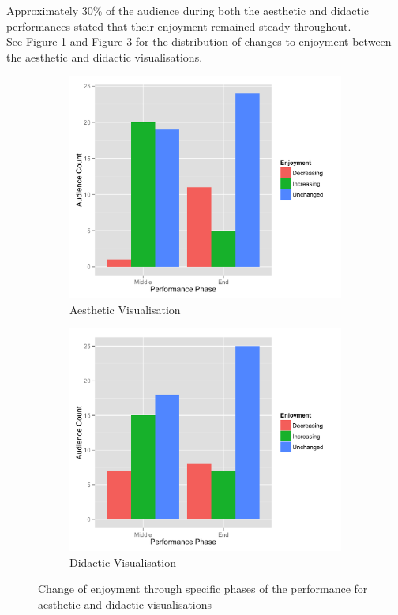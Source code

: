 \documentclass[12pt]{article}
\begin{document}
Approximately $30\%$ of the audience during both the aesthetic and didactic performances stated that their enjoyment remained steady throughout.\\

See Figure \ref{aestheticenjoymentchange} and Figure \ref{didacticenjoymentchange} for the distribution of changes to enjoyment between the aesthetic and didactic visualisations.\\

\begin{figure}[t]
\centering
\begin{subfigure}{.5\textwidth}
    \centering
    \includegraphics[width=1.0\linewidth]{graphs/enjoyment-change-aesthetic.png}
    \caption{Aesthetic Visualisation}
    \label{aestheticenjoymentchange}
\end{subfigure}%
\begin{subfigure}{.5\textwidth}
    \centering
    \includegraphics[width=1.0\linewidth]{graphs/enjoyment-change-didactic.png}
    \caption{Didactic Visualisation}
    \label{didacticenjoymentchange}
\end{subfigure}
\caption{Change of enjoyment through specific phases of the performance for aesthetic and didactic visualisations}
\end{figure}
\end{document}
